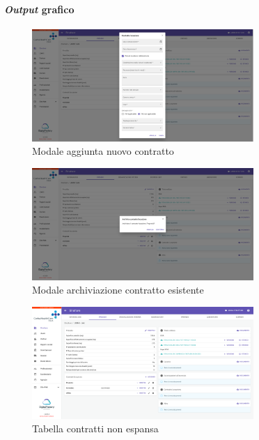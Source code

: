 \paragraph{\textit{Output} grafico}
\begin{figure}[H]
    \centering
    \includegraphics[width=0.75\textwidth]{images/capitolo5/f4_rentalAgreement/RentalAgreement_create.png} 
    \caption{Modale aggiunta nuovo contratto} 
    \label{fig:RentalAgreement_create}
\end{figure}

\begin{figure}[H]
    \centering
    \includegraphics[width=0.75\textwidth]{images/capitolo5/f4_rentalAgreement/ModalRentalAgreement_archive.png} 
    \caption{Modale archiviazione contratto esistente} 
    \label{fig:ModalRentalAgreement_archive}
\end{figure}

\begin{figure}[H]
    \centering
    \includegraphics[width=0.75\textwidth]{images/capitolo5/f4_rentalAgreement/RentalAgreement_collapsed.png} 
    \caption{Tabella contratti non espansa} 
    \label{fig:RentalAgreement_collapsed}
\end{figure}

